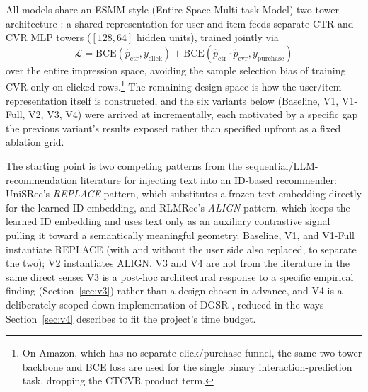 \documentclass{uclthesis}
\begin{document}
All models share an ESMM-style (Entire Space Multi-task Model) two-tower architecture \citep{ma2018esmm}: a shared representation for user and item feeds separate CTR and CVR MLP towers ($[128, 64]$ hidden units), trained jointly via
\[
\mathcal{L} = \text{BCE}(\hat{p}_{\text{ctr}}, y_{\text{click}}) + \text{BCE}(\hat{p}_{\text{ctr}} \cdot \hat{p}_{\text{cvr}}, y_{\text{purchase}})
\]
over the entire impression space, avoiding the sample selection bias of training CVR only on clicked rows.\footnote{On Amazon, which has no separate click/purchase funnel, the same two-tower backbone and BCE loss are used for the single binary interaction-prediction task, dropping the CTCVR product term.} The remaining design space is how the user/item representation itself is constructed, and the six variants below (Baseline, V1, V1-Full, V2, V3, V4) were arrived at incrementally, each motivated by a specific gap the previous variant's results exposed rather than specified upfront as a fixed ablation grid.

The starting point is two competing patterns from the sequential/LLM-recommendation literature for injecting text into an ID-based recommender: UniSRec's \citep{hou2022unisrec} \emph{REPLACE} pattern, which substitutes a frozen text embedding directly for the learned ID embedding, and RLMRec's \citep{ren2024rlmrec} \emph{ALIGN} pattern, which keeps the learned ID embedding and uses text only as an auxiliary contrastive signal pulling it toward a semantically meaningful geometry. Baseline, V1, and V1-Full instantiate REPLACE (with and without the user side also replaced, to separate the two); V2 instantiates ALIGN. V3 and V4 are not from the literature in the same direct sense: V3 is a post-hoc architectural response to a specific empirical finding (Section~\ref{sec:v3}) rather than a design chosen in advance, and V4 is a deliberately scoped-down implementation of DGSR \citep{zhang2022dgsr}, reduced in the ways Section~\ref{sec:v4} describes to fit the project's time budget.
\end{document}
